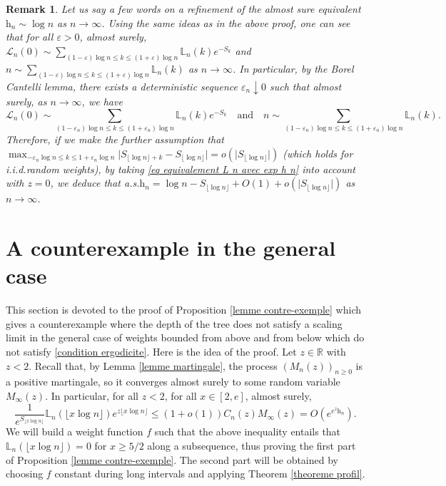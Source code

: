\documentclass[11pt]{article}
\newtheorem{remark}[theorem]{Remark}
\numberwithin{equation}{section}
\def\vp{\varepsilon}
\def \R{\mathbb {R}}
\def \cL{\mathcal{L}}
\begin{document}
\begin{remark}\label{more precise behaviour of h n}
	Let us say a few words on a refinement of the almost sure equivalent $\mathrm{h}_n \sim \log n$ as $n\to \infty$. Using the same ideas as in the above proof, one can see that for all $\vp>0$, almost surely, $\cL_n(0) \sim \sum_{(1-\vp)\log n \le k \le (1+\vp) \log n} \mathbb{L}_n(k)e^{-S_k}$ and $n\sim \sum_{(1-\vp)\log n \le k \le (1+\vp) \log n} \mathbb{L}_n(k)$ as $n\to \infty$. In particular, by the Borel Cantelli lemma, there exists a deterministic sequence $\vp_n \downarrow 0$ such that almost surely, as $n\to \infty$, we have 
	\[\cL_n(0) \sim \sum_{(1-\vp_n)\log n \le k \le (1+\vp_n) \log n} \mathbb{L}_n(k)e^{-S_k} \quad \text{and}\quad n\sim\sum_{(1-\vp_n)\log n \le k \le (1+\vp_n) \log n} \mathbb{L}_n(k).\] 
	Therefore, if we make the further assumption that $\max_{-\vp_n \log n \le k \le 1+\vp_n \log n} \vert S_{\lfloor \log n \rfloor +k}- S_{\lfloor \log n \rfloor}\vert = o(\vert S_{\lfloor \log n \rfloor}\vert)$ (which holds for i.i.d.\@ random weights), by taking \eqref{eq equivalement L n avec exp h n} into account with $z=0$, we deduce that a.s.\@ $\mathrm{h}_n=\log n - S_{\lfloor \log n \rfloor}+ O(1)+ o(\vert S_{\lfloor \log n\rfloor} \vert)$ as $n\to \infty$. 
\end{remark}

\section{A counterexample in the general case}\label{section contre-exemple}
This section is devoted to the proof of Proposition \ref{lemme contre-exemple} which gives a counterexample where the depth of the tree does not satisfy a scaling limit in the general case of weights bounded from above and from below which do not satisfy \eqref{condition ergodicite}. Here is the idea of the proof. Let $z\in \R$ with $z<2$. Recall that, by Lemma \ref{lemme martingale}, the process $(M_n(z))_{n\ge 0}$ is a positive martingale, so it converges almost surely to some random variable $M_\infty(z)$. In particular, for all $z <2$, for all $x \in [2, e]$, almost surely, 
\begin{equation*}
	\frac{1}{e^{S_{\lfloor x \log n \rfloor}}} \mathbb{L}_n(\lfloor x \log n \rfloor) e^{z \lfloor x \log n \rfloor} \le (1+o(1)) C_n(z) M_\infty(z) = O \left( e^{e^z \mathrm{h}_n } \right).
\end{equation*}
We will build a weight function $f$ such that the above inequality entails that $\mathbb{L}_n(\lfloor x \log n \rfloor)=0$ for $x\ge 5/2$ along a subsequence, thus proving the first part of Proposition \ref{lemme contre-exemple}. The second part will be obtained by choosing $f$ constant during long intervals and applying Theorem \ref{theoreme profil}.
\end{document}
